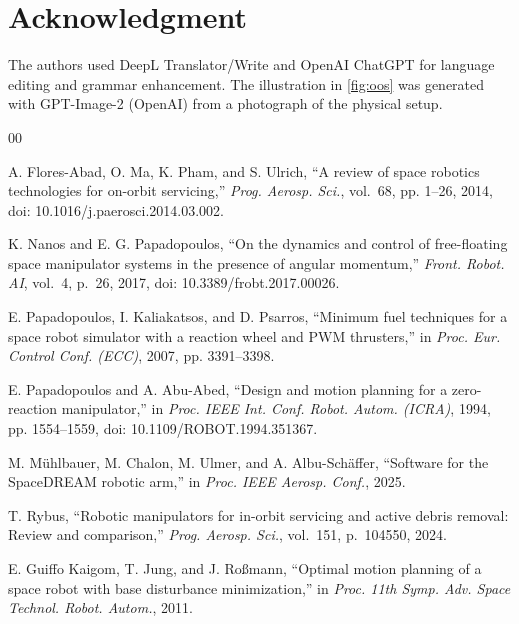 \documentclass{ieeeaccess}
\begin{document}
\section*{Acknowledgment}
The authors used DeepL Translator/Write and OpenAI ChatGPT
for language editing and grammar enhancement. The illustration in \cref{fig:oos} was generated with
GPT-Image-2 (OpenAI) from a photograph of the physical setup.
\begin{thebibliography}{00}

 A. Flores-Abad, O. Ma, K. Pham, and S. Ulrich, ``A review of space robotics technologies for
on-orbit servicing,'' \emph{Prog. Aerosp. Sci.}, vol.~68, pp. 1--26, 2014, doi:
10.1016/j.paerosci.2014.03.002.



K. Nanos and E. G. Papadopoulos, ``On the dynamics and control of free-floating space
manipulator systems in the presence of angular momentum,'' \emph{Front. Robot. AI}, vol.~4, p.~26, 2017,
doi: 10.3389/frobt.2017.00026.



E. Papadopoulos, I. Kaliakatsos, and D. Psarros, ``Minimum fuel techniques for a space robot
simulator with a reaction wheel and PWM thrusters,'' in \emph{Proc. Eur. Control Conf. (ECC)},
2007, pp. 3391--3398.



E. Papadopoulos and A. Abu-Abed, ``Design and motion planning for a zero-reaction manipulator,'' in
\emph{Proc. IEEE Int. Conf. Robot. Autom. (ICRA)}, 1994, pp. 1554--1559, doi: 10.1109/ROBOT.1994.351367.



M. M{\"u}hlbauer, M. Chalon, M. Ulmer, and A. Albu-Sch{\"a}ffer, ``Software for the SpaceDREAM robotic
arm,'' in \emph{Proc. IEEE Aerosp. Conf.}, 2025.



T. Rybus, ``Robotic manipulators for in-orbit servicing and active debris removal: Review and comparison,''
\emph{Prog. Aerosp. Sci.}, vol.~151, p.~104550, 2024.




E. Guiffo Kaigom, T. Jung, and J. Roßmann, ``Optimal motion planning of a space
robot with base disturbance minimization,'' in \emph{Proc. 11th Symp. Adv. Space Technol. Robot. Autom.},
2011.


\end{thebibliography}
\end{document}
